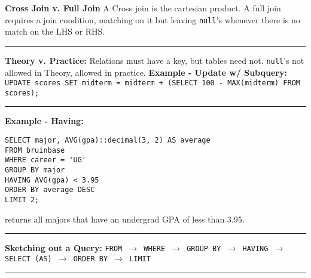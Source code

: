 \documentclass{report}
\renewcommand{\bf}[1]{\textbf{{#1}}}
\renewcommand{\tt}[1]{\texttt{{#1}}}
\begin{document}
\bf{Cross Join v. Full Join} A Cross join is the cartesian product. A full join requires a join
condition, matching on it but leaving \tt{null}'s whenever there is no match on the LHS or RHS.
\hfil \newline
\vspace{-0.8em}
\hrule
\vspace{0.2em}

\bf{Theory v. Practice:} Relations must have a key, but tables need not. \tt{null}'s not allowed in
Theory, allowed in practice.
\hfil \newline
\bf{Example - Update w/ Subquery:} \tt{UPDATE scores SET midterm = midterm + (SELECT 100 - MAX(midterm)
FROM scores);}
\hfil \newline
\vspace{-0.8em}
\hrule
\vspace{0.2em}

\bf{Example - Having:}
\vspace{-1em}
\begin{verbatim}
SELECT major, AVG(gpa)::decimal(3, 2) AS average
FROM bruinbase
WHERE career = 'UG'
GROUP BY major
HAVING AVG(gpa) < 3.95
ORDER BY average DESC
LIMIT 2;
\end{verbatim}
\vspace{-1em}
returns all majors that have an undergrad GPA of less than 3.95.
\hfil \newline
\vspace{-0.8em}
\hrule
\vspace{0.2em}

\bf{Sketching out a Query:}
\tt{FROM $\to$ WHERE $\to$ GROUP BY $\to$ HAVING $\to$ SELECT (AS) $\to$ ORDER BY $\to$ LIMIT}
\hfil \newline
\vspace{-0.8em}
\hrule
\vspace{0.2em}
\end{document}
